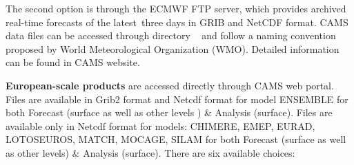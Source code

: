 \documentclass[9pt]{report}
\begin{document}
The second option is through the ECMWF FTP server, which provides archived real-time forecasts of the latest three days in GRIB and NetCDF format.
CAMS data files can be accessed through directory ~ and follow a naming convention proposed by World Meteorological Organization (WMO). 
Detailed information can be found in CAMS website.%

\mdbr
{}\textbf{European-scale products} are accessed directly through CAMS web portal. Files are available in Grib2 format and Netcdf format for model ENSEMBLE for both Forecast (surface as well as other levels ) \& Analysis (surface).
Files are available only in Netcdf format for models: CHIMERE, EMEP, EURAD, LOTOSEUROS, MATCH, MOCAGE, SILAM for both Forecast (surface as well as other levels) \& Analysis (surface). 
There are six available choices:%
\end{document}
